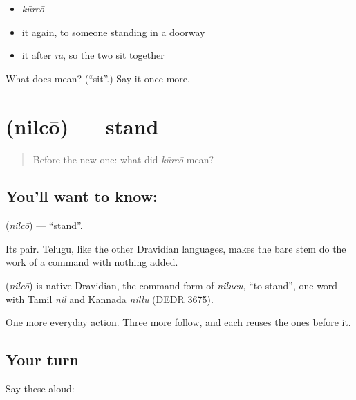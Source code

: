 \begin{itemize}
\raggedright
  \item \emph{kūrcō}
  \item it again, to someone standing in a doorway
  \item it after \emph{rā}, so the two sit together
\end{itemize}

\begin{tcolorbox}[breakable,colback=teal!4,colframe=teal!35!black,title={Before you move on}]
What does  mean? (\textquotedblleft{}sit\textquotedblright{}.) Say it once more.
\end{tcolorbox}
\section[\texorpdfstring{\te{నిల్చో} (nilcō)}{నిల్చో (nilcō)}]{ (nilcō) — stand}

\label{lesson:TE-C43-stand}



\begin{quote}
Before the new one: what did \emph{kūrcō} mean?
\end{quote}

\subsection*{You'll want to know: }
\textbf{} (\emph{nilcō}) — \textquotedblleft{}stand\textquotedblright{}.

Its pair. Telugu, like the other Dravidian languages, makes the bare stem do the work of a command with nothing added.

\begin{cousinweb}
\textbf{} (\emph{nilcō}) is native Dravidian, the command form of \emph{nilucu}, \textquotedblleft{}to stand\textquotedblright{}, one word with Tamil \emph{nil} and Kannada \emph{nillu} (DEDR 3675).
\end{cousinweb}

\begin{grammarlens}[title={What you've built}]
One more everyday action. Three more follow, and each reuses the ones before it.
\end{grammarlens}

\subsection*{Your turn}
Say these aloud:

